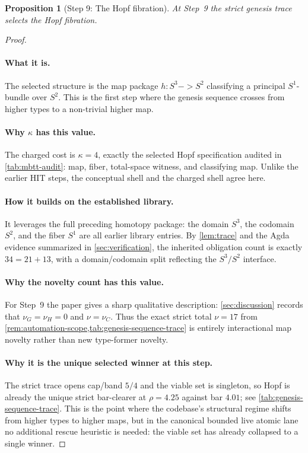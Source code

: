 \documentclass[11pt,a4paper]{article}
\def\to{->}%
\theoremstyle{plain}
\newtheorem{proposition}[theorem]{Proposition}
\theoremstyle{definition}
\theoremstyle{remark}
\begin{document}
\begin{proposition}[Step 9: The Hopf fibration]
\label{prop:genesis-step9}
At Step~9 the strict genesis trace selects the Hopf fibration.
\end{proposition}

\begin{proof}
\paragraph{What it is.}
The selected structure is the map package
$h:S^3\to S^2$ classifying a principal $S^1$-bundle over $S^2$.
This is the first step where the genesis sequence crosses from higher types to a
non-trivial higher map.

\paragraph{Why $\kappa$ has this value.}
The charged cost is $\kappa=4$, exactly the selected Hopf specification audited
in \cref{tab:mbtt-audit}: map, fiber, total-space witness, and classifying map.
Unlike the earlier HIT steps, the conceptual shell and the charged shell agree
here.

\paragraph{How it builds on the established library.}
It leverages the full preceding homotopy package:
the domain $S^3$, the codomain $S^2$, and the fiber $S^1$ are all earlier
library entries.
By \cref{lem:trace} and the Agda evidence summarized in
\cref{sec:verification}, the inherited obligation count is exactly
$34=21+13$, with a domain/codomain split reflecting the $S^3/S^2$ interface.

\paragraph{Why the novelty count has this value.}
For Step~9 the paper gives a sharp qualitative description:
\cref{sec:discussion} records that $\nu_G=\nu_H=0$ and $\nu=\nu_C$.
Thus the exact strict total $\nu=17$ from
\cref{rem:automation-scope,tab:genesis-sequence-trace} is entirely interactional
map novelty rather than new type-former novelty.

\paragraph{Why it is the unique selected winner at this step.}
The strict trace opens cap/band $5/4$ and the viable set is singleton, so Hopf
is already the unique strict bar-clearer at $\rho=4.25$ against bar $4.01$; see
\cref{tab:genesis-sequence-trace}.
This is the point where the codebase's structural regime shifts from higher
types to higher maps, but in the canonical bounded live atomic lane no additional rescue
heuristic is needed: the viable set has already collapsed to a single winner.
\end{proof}
\end{document}
